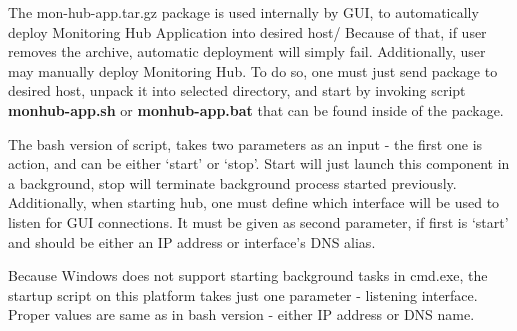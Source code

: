 The mon-hub-app.tar.gz package is used internally by GUI, to automatically deploy Monitoring Hub Application into desired host/ Because of that, if user removes the archive, automatic deployment will simply fail. Additionally, user may manually deploy Monitoring Hub. To do so, one must just send package to desired host, unpack it into selected directory, and start by invoking script {\bf monhub-app.sh} or {\bf monhub-app.bat} that can be found inside of the package. 

The bash version of script, takes two parameters as an input - the first one is action, and can be either \lq{}start\rq{} or \lq{}stop\rq{}. Start will just launch this component in a background, stop will terminate background process started previously. Additionally, when starting hub, one must define which interface will be used to listen for GUI connections. It must be given as second parameter, if first is \lq{}start\rq{} and should be either an IP address or interface\rq{}s DNS alias.  

Because Windows does not support starting background tasks in cmd.exe, the startup script on this platform takes just one parameter - listening interface. Proper values are same as in bash version - either IP  address or DNS name.